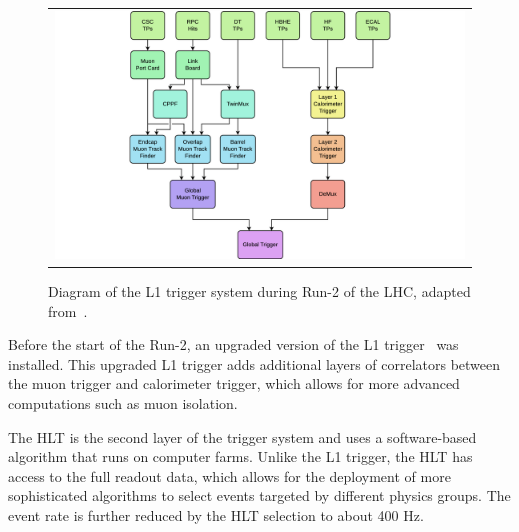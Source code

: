 \begin{figure}[tbh!]
 \begin{center}
 \begin{tabular}{c}
 \includegraphics[width=1\textwidth]{figures/Part2/CMS/L1T}
 \end{tabular}
 \caption{Diagram of the \ac{L1} trigger system during Run-2 of the \ac{LHC}, adapted from~\cite{CMS:2020cmk}.}
 \label{fig:L1T}
 \end{center}
\end{figure}

Before the start of the Run-2, an upgraded version of the \ac{L1} trigger~\cite{Tapper:2013yva} was installed. This upgraded \ac{L1} trigger adds additional layers of correlators between the muon trigger and calorimeter trigger, which allows for more advanced computations such as muon isolation. 

The \ac{HLT} is the second layer of the trigger system and uses a software-based algorithm that runs on computer farms. Unlike the \ac{L1} trigger, the \ac{HLT} has access to the full readout data, which allows for the deployment of more sophisticated algorithms to select events targeted by different physics groups. The event rate is further reduced by the \ac{HLT} selection to about 400 Hz.